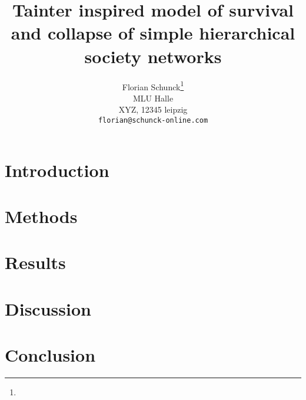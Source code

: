 \documentclass{article}
\title{Tainter inspired model of survival and collapse of simple hierarchical society networks}
\author{
  Florian Schunck\thanks{} \\
  MLU Halle \\
  XYZ, 12345 leipzig \\
  \texttt{florian@schunck-online.com} \\
 }
\theoremstyle{plain}
\begin{document}
\maketitle

\begin{abstract}
    
\end{abstract}




\section{Introduction}


\section{Methods}


\section{Results}


\section{Discussion}


\section{Conclusion}




\end{document}
